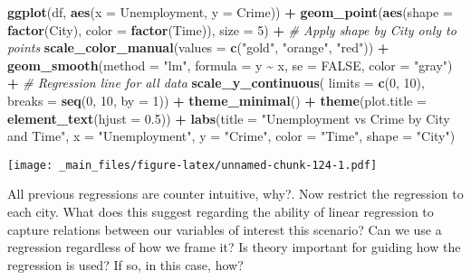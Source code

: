 \documentclass[
]{book}
\newenvironment{Shaded}{\begin{snugshade}}{\end{snugshade}}
\newcommand{\AttributeTok}[1]{\textcolor[rgb]{0.13,0.29,0.53}{#1}}
\newcommand{\CommentTok}[1]{\textcolor[rgb]{0.56,0.35,0.01}{\textit{#1}}}
\newcommand{\ConstantTok}[1]{\textcolor[rgb]{0.56,0.35,0.01}{#1}}
\newcommand{\DecValTok}[1]{\textcolor[rgb]{0.00,0.00,0.81}{#1}}
\newcommand{\FloatTok}[1]{\textcolor[rgb]{0.00,0.00,0.81}{#1}}
\newcommand{\FunctionTok}[1]{\textcolor[rgb]{0.13,0.29,0.53}{\textbf{#1}}}
\newcommand{\NormalTok}[1]{#1}
\newcommand{\SpecialCharTok}[1]{\textcolor[rgb]{0.81,0.36,0.00}{\textbf{#1}}}
\newcommand{\StringTok}[1]{\textcolor[rgb]{0.31,0.60,0.02}{#1}}
\begin{document}
\begin{Shaded}
\begin{Highlighting}[]
\FunctionTok{ggplot}\NormalTok{(df, }\FunctionTok{aes}\NormalTok{(}\AttributeTok{x =}\NormalTok{ Unemployment, }\AttributeTok{y =}\NormalTok{ Crime)) }\SpecialCharTok{+}
  \FunctionTok{geom\_point}\NormalTok{(}\FunctionTok{aes}\NormalTok{(}\AttributeTok{shape =} \FunctionTok{factor}\NormalTok{(City), }\AttributeTok{color =} \FunctionTok{factor}\NormalTok{(Time)), }\AttributeTok{size =} \DecValTok{5}\NormalTok{) }\SpecialCharTok{+}  \CommentTok{\# Apply shape by City only to points}
  \FunctionTok{scale\_color\_manual}\NormalTok{(}\AttributeTok{values =} \FunctionTok{c}\NormalTok{(}\StringTok{"gold"}\NormalTok{, }\StringTok{"orange"}\NormalTok{, }\StringTok{"red"}\NormalTok{)) }\SpecialCharTok{+}
  \FunctionTok{geom\_smooth}\NormalTok{(}\AttributeTok{method =} \StringTok{"lm"}\NormalTok{, }\AttributeTok{formula =}\NormalTok{ y }\SpecialCharTok{\textasciitilde{}}\NormalTok{ x, }\AttributeTok{se =} \ConstantTok{FALSE}\NormalTok{, }\AttributeTok{color =} \StringTok{"gray"}\NormalTok{) }\SpecialCharTok{+}  \CommentTok{\# Regression line for all data}
  \FunctionTok{scale\_y\_continuous}\NormalTok{(}
    \AttributeTok{limits =} \FunctionTok{c}\NormalTok{(}\DecValTok{0}\NormalTok{, }\DecValTok{10}\NormalTok{),}
    \AttributeTok{breaks =} \FunctionTok{seq}\NormalTok{(}\DecValTok{0}\NormalTok{, }\DecValTok{10}\NormalTok{, }\AttributeTok{by =} \DecValTok{1}\NormalTok{)) }\SpecialCharTok{+}
  \FunctionTok{theme\_minimal}\NormalTok{() }\SpecialCharTok{+}
  \FunctionTok{theme}\NormalTok{(}\AttributeTok{plot.title =} \FunctionTok{element\_text}\NormalTok{(}\AttributeTok{hjust =} \FloatTok{0.5}\NormalTok{)) }\SpecialCharTok{+}
  \FunctionTok{labs}\NormalTok{(}\AttributeTok{title =} \StringTok{"Unemployment vs Crime by City and Time"}\NormalTok{,}
       \AttributeTok{x =} \StringTok{"Unemployment"}\NormalTok{,}
       \AttributeTok{y =} \StringTok{"Crime"}\NormalTok{,}
       \AttributeTok{color =} \StringTok{"Time"}\NormalTok{,}
       \AttributeTok{shape =} \StringTok{"City"}\NormalTok{)}
\end{Highlighting}
\end{Shaded}

\texttt{[image: \_main\_files/figure-latex/unnamed-chunk-124-1.pdf]}

All previous regressions are counter intuitive, why?. Now restrict the regression to each city. What does this suggest regarding the ability of linear regression to capture relations between our variables of interest this scenario? Can we use a regression regardless of how we frame it? Is theory important for guiding how the regression is used? If so, in this case, how?
\end{document}
